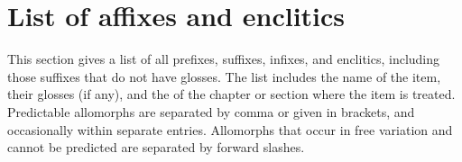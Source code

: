 \chapter{List of affixes and enclitics}
\label{apx:appendix}



\label{apx:List of affixes and enclitics}

This section gives a list of all prefixes, suffixes, infixes, and enclitics, including those suffixes that do not have glosses. The list includes the name of the item, their glosses (if any), and the  of the chapter or section where the item is treated. Predictable allomorphs are separated by comma or given in brackets, and occasionally within separate entries. Allomorphs that occur in free variation and cannot be predicted are separated by forward slashes.
 
